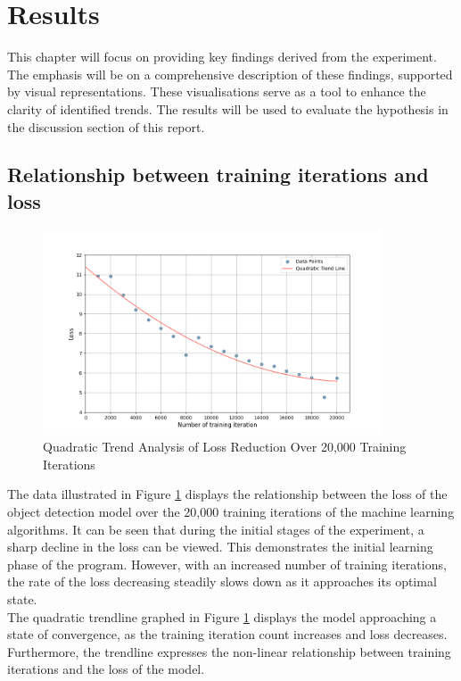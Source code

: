 \section{Results}
This chapter will focus on providing key findings derived from the experiment.
The emphasis will be on a comprehensive description of these findings, supported by visual representations. These visualisations serve
as a tool to enhance the clarity of identified trends. The results will be used to evaluate the hypothesis in the discussion section of this report.\\

\subsection{Relationship between training iterations and loss}
\begin{figure}[h]
   \centering
   \includegraphics[width=0.9\textwidth]{../Data/loss_by_iteration_plot.png}
   \caption{Quadratic Trend Analysis of Loss Reduction Over 20,000 Training Iterations}
   \label{fig:loss-vs-training-iterations}
\end{figure}
The data illustrated in Figure \ref{fig:loss-vs-training-iterations} displays the relationship between the loss of the object detection model over the 20,000 training iterations of the machine learning algorithms. It can be seen that during the initial stages of the experiment, a sharp decline in the loss can be viewed. This demonstrates the initial learning phase of the program. However, with an increased number of training iterations, the rate of the loss decreasing steadily slows down as it approaches its optimal state. \\

The quadratic trendline graphed in Figure \ref{fig:loss-vs-training-iterations}  displays the model approaching a state of convergence, as the training iteration count increases and loss decreases. Furthermore, the trendline expresses the non-linear relationship between training iterations and the loss of the model. \\
\newpage

